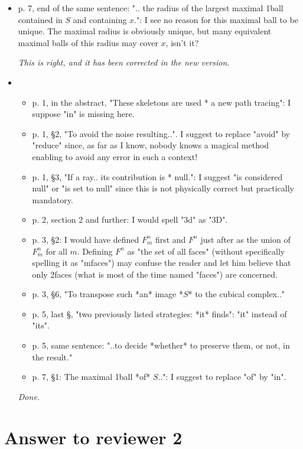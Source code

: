 \documentclass[final,envcountsame]{article}
\begin{document}
\begin{itemize}
\item p. 7, end of the same sentence: ".. the radius of the largest maximal 1­ball contained in $S$ and containing $x$.": I see no reason for this maximal ball to be unique. The maximal radius is obviously unique, but many equivalent maximal balls of this radius may cover $x$, isn't it? 

\textit{This is right, and it has been corrected in the new version.} \\


\item \begin{itemize}
\item p. 1, in the abstract, "These skeletons are used * a new path tracing": I suppose "in" is missing here. 
\item p. 1, §2, "To avoid the noise resulting..". I suggest to replace "avoid" by "reduce" since, as far as I know, nobody knows a magical method enabling to avoid any error in such a context! 
\item p. 1, §3, "If a ray.. its contribution is * null.": I suggest "is considered null" or "is set to null" since this is not physically correct but practically mandatory. 
\item p. 2, section 2 and further: I would spell "3d" as "3D". 
\item p. 3, §2: I would have defined $F^n_m$ first and $F^n$ just after as the union of $F^n_m$ for all $m$. Defining $F^n$ as "the set of all faces" (without specifically spelling it as "m­faces") may confuse the reader and let him believe that only 2­faces (what is most of the time named "faces") are concerned. 
\item p. 3, §6, "To transpose such *an* image *$S$* to the cubical complex.." 
\item p. 5, last §, "two previously listed strategies: *it* finds": "it" instead of "its". 
\item p. 5, same sentence: "..to decide *whether* to preserve them, or not, in the result." 
\item p. 7, §1: The maximal 1­ball *of* $S$..": I suggest to replace "of" by "in". 
\end{itemize}

\textit{Done.} \\


\end{itemize}


\section{Answer to reviewer 2}
\end{document}
